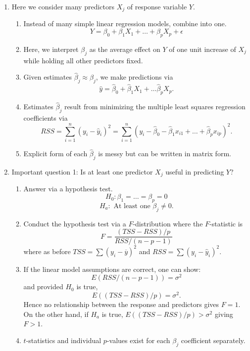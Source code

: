 \documentclass{article}
\begin{document}
\begin{enumerate}
\item Here we consider many predictors $X_j$ of response variable $Y$. 
\begin{enumerate}
\item Instead of many simple linear regression models, combine into one.
\[
Y = \beta_0 + \beta_1 X_1 + \dots + \beta_p X_p + \epsilon
\]
\item Here, we interpret $\beta_j$ as the average effect on $Y$ of one unit increase of $X_j$ while holding all other predictors fixed.
\item Given estimates $\hat{\beta}_j \approx \beta_j$, we make predictions via
\[
\hat{y} = \hat{\beta}_0+\hat{\beta}_1X_1 + \dots \hat{\beta}_pX_p.
\]
\item Estimates $\hat{\beta}_j$ result from minimizing the multiple least squares regression coefficients via
\[
RSS = \sum_{i=1}^n (y_i - \hat{y}_i)^2 = \sum_{i=1}^n (y_i - \hat{\beta}_0 - \hat{\beta}_1 x_{i1} + \dots + \hat{\beta}_p x_{ip})^2.
\]
\item Explicit form of each $\hat{\beta}_j$ is messy but can be written in matrix form.
\end{enumerate}

\item Important question 1: Is at least one predictor $X_j$ useful in predicting $Y$?
\begin{enumerate}
\item Answer via a hypothesis test.
\[
H_0: \beta_1 = \dots = \beta_p = 0
\]
\[
H_a: \text{ At least one $\beta_j \neq 0$.}
\]
\item Conduct the hypothesis test via a $F$-distribution where the $F$-statistic is
\[
F = \frac{(TSS-RSS)/p}{RSS/(n-p-1)}
\]
where as before $TSS=\sum(y_i-\overline{y})^2$ and $RSS=\sum(y_i-\hat{y}_i)^2$. 
\item If the linear model assumptions are correct, one can show:
\[
E(RSS/(n-p-1))=\sigma^2
\]
and provided $H_0$ is true,
\[
E((TSS-RSS)/p)=\sigma^2.
\]
Hence no relationship between the response and predictors gives $F=1$. On the other hand, if $H_a$ is true, $E((TSS-RSS)/p)>\sigma^2$ giving $F>1$. 
\item $t$-statistics and individual $p$-values exist for each $\beta_j$ coefficient separately.
\end{enumerate}


\end{enumerate}
\end{document}
